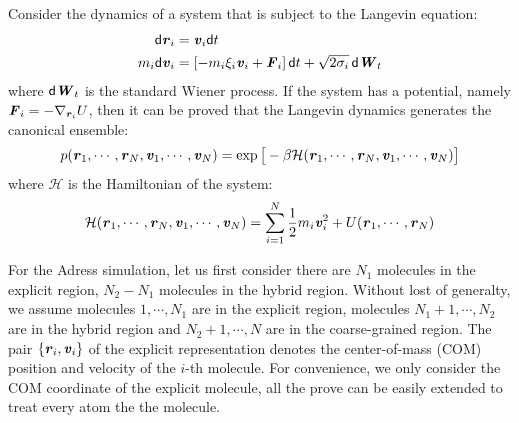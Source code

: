 \documentclass[aps,pre,preprint]{revtex4}
\renewcommand{\v}[1]{\textbf{\textit{#1}}}
\renewcommand{\d}[1]{\textsf{#1}}
\begin{document}
Consider the dynamics of a system that is subject to the Langevin equation:
\begin{align}
  \d d\v r_i &= \v v_i\d dt\\
  m_i\d d\v v_i &= [-m_i\xi_i\v v_i + \v F_i]\,\d dt + \sqrt{2\sigma_i}\,\d d\v W_t
\end{align}
where $\d d\v W_t$ is the standard Wiener process.  If the system has a
potential, namely $\v F_i = -\nabla_{\v r_i}U$, then it can be proved that the
Langevin dynamics generates the canonical ensemble:
\begin{align}
  p(\v r_1, \cdots, \v r_N, \v v_1, \cdots, \v v_N)
  = \exp\big[
  -\beta \mathcal H(\v r_1, \cdots, \v r_N, \v v_1, \cdots, \v v_N)
  \big]
\end{align}
where $\mathcal H$ is the Hamiltonian of the system:
\begin{align}
  \mathcal H(\v r_1, \cdots, \v r_N, \v v_1, \cdots, \v v_N)
  =
  \sum_{i=1}^N\frac12 m_i\v v_i^2 + U(\v r_1, \cdots, \v r_N)  
\end{align}

For the Adress simulation, let us first consider there are $N_1$
molecules in the explicit region, $N_2 - N_1$ molecules in the hybrid
region.  Without lost of generalty, we assume molecules $1, \cdots,
N_1$ are in the explicit region, molecules $N_1 + 1, \cdots, N_2$ are
in the hybrid region and $N_2+1, \cdots, N$ are in the coarse-grained
region. The pair $\{\v r_i, \v v_i\}$ of the explicit representation
denotes the center-of-mass (COM) position and velocity of the $i$-th
molecule. For convenience, we only consider the COM coordinate of the
explicit molecule, all the prove can be easily extended to treat every
atom the the molecule.
\end{document}
